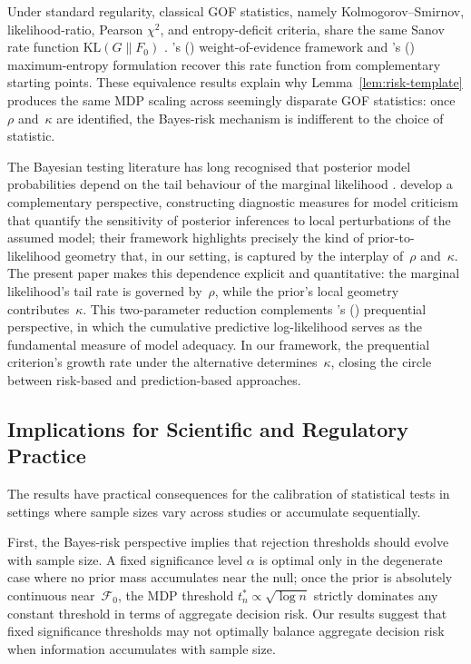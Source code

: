 \documentclass[11pt]{article}
\newcommand{\KL}{\mathrm{KL}}
\newcommand{\calF}{\mathcal{F}}
\newcommand{\rhotail}{\rho}  %
\newcommand{\1}{\mathbf{1}}
\theoremstyle{plain}
\theoremstyle{definition}
\theoremstyle{remark}
\begin{document}
Under standard regularity, classical GOF statistics, namely Kolmogorov--Smirnov, likelihood-ratio, Pearson $\chi^2$, and entropy-deficit criteria, share the same Sanov rate function $\KL(G\|F_0)$ \citep{Sanov1957, Hoeffding1965}.
\citeauthor{Good1955}'s (\citeyear{Good1955}) weight-of-evidence framework and \citeauthor{Jaynes1957}'s (\citeyear{Jaynes1957}) maximum-entropy formulation recover this rate function from complementary starting points.
These equivalence results explain why Lemma~\ref{lem:risk-template} produces the same MDP scaling across seemingly disparate GOF statistics: once $\rhotail$ and~$\kappa$ are identified, the Bayes-risk mechanism is indifferent to the choice of statistic.

The Bayesian testing literature has long recognised that posterior model probabilities depend on the tail behaviour of the marginal likelihood \citep{Dawid2011PosteriorModelProbabilities}.
\citet{CarotaParmigiani1996} develop a complementary perspective, constructing diagnostic measures for model criticism that quantify the sensitivity of posterior inferences to local perturbations of the assumed model; their framework highlights precisely the kind of prior-to-likelihood geometry that, in our setting, is captured by the interplay of~$\rhotail$ and~$\kappa$.
The present paper makes this dependence explicit and quantitative: the marginal likelihood's tail rate is governed by~$\rhotail$, while the prior's local geometry contributes~$\kappa$.
This two-parameter reduction complements \citeauthor{Dawid1992Prequential}'s (\citeyear{Dawid1992Prequential}) prequential perspective, in which the cumulative predictive log-likelihood serves as the fundamental measure of model adequacy.
In our framework, the prequential criterion's growth rate under the alternative determines~$\kappa$, closing the circle between risk-based and prediction-based approaches.


\subsection{Implications for Scientific and Regulatory Practice}

The results have practical consequences for the calibration of statistical tests in settings where sample sizes vary across studies or accumulate sequentially.

First, the Bayes-risk perspective implies that rejection thresholds should evolve with sample size.
A fixed significance level $\alpha$ is optimal only in the degenerate case where no prior mass accumulates near the null; once the prior is absolutely continuous near~$\calF_0$, the MDP threshold $t_n^{*}\propto\sqrt{\log n}$ strictly dominates any constant threshold in terms of aggregate decision risk.
Our results suggest that fixed significance thresholds may not optimally balance aggregate decision risk when information accumulates with sample size.
\end{document}

